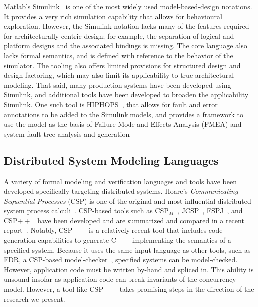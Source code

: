 Matlab's Simulink~\cite{simulink} is  one of the most widely used
model-based-design notations. It provides a very rich
simulation capability that allows for behavioural exploration. However, the
Simulink notation lacks many of the features required for architecturally
centric design; for example, the separation of logical and platform designs and
the associated bindings is missing. The core language also lacks formal
semantics, and is defined with reference to the behavior of the simulator. The
tooling also offers limited provisions for structured design and design
factoring, which may also limit its applicability to true architectural
modeling.    That said, many production systems have been developed using Simulink, and additional tools have been developed to broaden the
applicability Simulink.   One such tool is HIPHOPS~\cite{papadopoulos2011engineering}, that allows for fault and error annotations to be added to the Simulink models, and provides a framework to use the model as the basis of Failure Mode and Effects Analysis (FMEA) and system fault-tree analysis and generation.
 



\subsection{Distributed System Modeling Languages}
A variety of formal modeling and verification languages and tools have been
developed specifically targeting distributed systems.  Hoare's
\emph{Communicating Sequential Processes} (CSP) is one of the original and most
influential distributed system process calculi~\cite{csp}. CSP-based tools such as
CSP$_M$~\cite{cspm}, JCSP~\cite{jcsp}, FSPJ~\cite{fspj}, and
CSP$++$~\cite{cspplus} have been developed and are summarized and compared in a
recent report~\cite{csp-masters}. Notably, CSP$++$ is a relatively recent tool
that includes code generation capabilities to generate C$++$ implementing the
semantics of a specified system. Because it uses the same input language as
other tools, such as FDR, a CSP-based model-checker~\cite{fdr}, specified
systems can be model-checked. However, application code must be written by-hand
and spliced in. This ability is unsound insofar as application code can break
invariants of the concurrency model. However, a tool like CSP$++$ takes
promising steps in the direction of the research we present.

